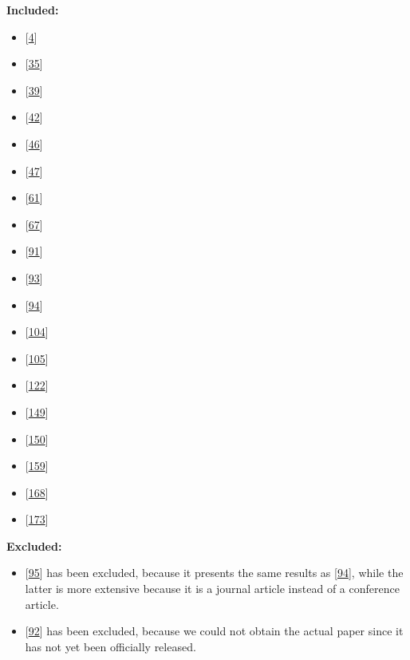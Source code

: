 \documentclass[]{book}
\providecommand{\tightlist}{%
  \setlength{\itemsep}{0pt}\setlength{\parskip}{0pt}}
\begin{document}
\textbf{Included:}

\begin{itemize}
\tightlist
\item
  {[}\protect\hyperlink{ref-adams2016a}{4}{]}
\item
  {[}\protect\hyperlink{ref-castelluccio2017a}{35}{]}
\item
  {[}\protect\hyperlink{ref-cesar2017a}{39}{]}
\item
  {[}\protect\hyperlink{ref-claes2017a}{42}{]}
\item
  {[}\protect\hyperlink{ref-da2014a}{46}{]}
\item
  {[}\protect\hyperlink{ref-da2016a}{47}{]}
\item
  {[}\protect\hyperlink{ref-dyck2015a}{61}{]}
\item
  {[}\protect\hyperlink{ref-fujibayashi2017a}{67}{]}
\item
  {[}\protect\hyperlink{ref-karvonen2017a}{91}{]}
\item
  {[}\protect\hyperlink{ref-kerzazi2013a}{93}{]}
\item
  {[}\protect\hyperlink{ref-khomh2015a}{94}{]}
\item
  {[}\protect\hyperlink{ref-laukkanen2017a}{104}{]}
\item
  {[}\protect\hyperlink{ref-laukkanen2018a}{105}{]}
\item
  {[}\protect\hyperlink{ref-mantyla2015a}{122}{]}
\item
  {[}\protect\hyperlink{ref-plewnia2014a}{149}{]}
\item
  {[}\protect\hyperlink{ref-poo-caamano2016a}{150}{]}
\item
  {[}\protect\hyperlink{ref-rodriguez2017a}{159}{]}
\item
  {[}\protect\hyperlink{ref-souza2015a}{168}{]}
\item
  {[}\protect\hyperlink{ref-teixeira2017a}{173}{]}
\end{itemize}

\textbf{Excluded:}

\begin{itemize}
\tightlist
\item
  {[}\protect\hyperlink{ref-khomh2012a}{95}{]} has been excluded,
  because it presents the same results as
  {[}\protect\hyperlink{ref-khomh2015a}{94}{]}, while the latter is more
  extensive because it is a journal article instead of a conference
  article.
\item
  {[}\protect\hyperlink{ref-kaur2019a}{92}{]} has been excluded, because
  we could not obtain the actual paper since it has not yet been
  officially released.
\end{itemize}
\end{document}

